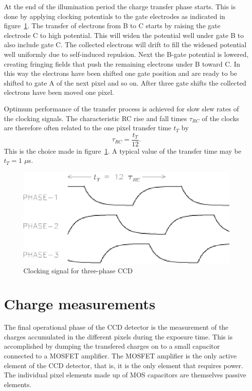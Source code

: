 At the end of the illumination period the charge transfer phase
starts. This is done by applying clocking potentials to the gate
electrodes as indicated in figure~\ref{CCD.figclocking}. The transfer
of electrons from B to C starts by raising the gate electrode C to
high potential. This will widen the potential well under gate B to
also include gate C. The collected electrons will drift to fill the
widened potential well uniformly due to self-induced repulsion. Next
the B-gate potential is lowered, creating fringing fields that push
the remaining electrons under B toward C. In this way the electrons
have been shifted one gate position and are ready to be shifted to
gate A of the next pixel and so on. After three gate shifts the
collected electrons have been moved one pixel.

Optimum performance of the transfer process is achieved for slow slew
rates of the clocking signals. The characteristic RC rise and fall times
 $\tau_{RC}$ of the clocks are therefore often related to the one pixel
transfer time $t_T$ by
\begin{equation}
  \tau_{RC} = \frac{t_T}{12}.
\end{equation}
This is the choice made in figure~\ref{CCD.figclocking}. A typical
value of the transfer time may be $t_T = 1$ $\mu$s.

\begin{figure}[h]
  \centering
	\includegraphics{CCD_clocking.eps}
  \caption{Clocking signal for three-phase CCD}
  \label{CCD.figclocking}
\end{figure}


\section{Charge measurements} 

The final operational phase of the CCD detector is the measurement of
the charges accumulated in the different pixels during the exposure
time. This is accomplished by dumping the transfered charges on to a
small capacitor connected to a MOSFET amplifier. The MOSFET amplifier
is the only active element of the CCD detector, that is, it is the
only element that requires power. The individual pixel elements made
up of MOS capacitors are themselves passive elements.

